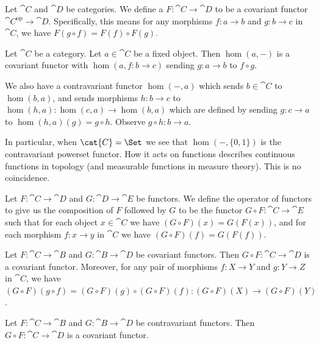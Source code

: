 \begin{definition}
Let $\cat{C}$ and $\cat{D}$ be categories.
We define a  $F\colon\cat{C}\to\cat{D}$
to be a covariant functor
$\cat{C}^{\text{op}}\to\cat{D}$. Specifically, this means for any
morphisms $f\colon a\to b$ and $g\colon b\to c$ in $\cat{C}$, we have
$F(g\circ f)=F(f)\circ F(g)$.
\end{definition}

\begin{example}
Let $\cat{C}$ be a category. Let $a\in\cat{C}$ be a fixed object.
Then $\hom(a,-)$ is a covariant functor with $\hom(a,f\colon b\to c)$
sending $g\colon a\to b$ to $f\circ g$.

We also have a contravariant functor $\hom(-,a)$ which sends
$b\in\cat{C}$ to $\hom(b,a)$, and sends morphisms $h\colon b\to c$ to
$\hom(h,a)\colon\hom(c,a)\to\hom(b,a)$ which are defined by sending
$g\colon c\to a$ to $\hom(h,a)(g)=g\circ h$. Observe $g\circ h\colon b\to a$.

In particular, when $\cat{C}=\Set$ we see that $\hom(-,\{0,1\})$ is
the contravariant powerset functor. How it acts on functions describes
continuous functions in topology (and measurable functions in measure
theory). This is no coincidence.
\end{example}

\begin{definition}
Let $F\colon\cat{C}\to\cat{D}$ and $G\colon\cat{D}\to\cat{E}$ be functors.
We define the  operator of functors to give us the
composition of $F$ followed by $G$ to be the functor $G\circ F\colon\cat{C}\to\cat{E}$
such that for each object $x\in\cat{C}$ we have $(G\circ F)(x)=G(F(x))$,
and for each morphism $f\colon x\to y$ in $\cat{C}$ we have
$(G\circ F)(f)=G(F(f))$.
\end{definition}

\begin{theorem}
Let $F\colon\cat{C}\to\cat{B}$ and $G\colon\cat{B}\to\cat{D}$ be
covariant functors. Then $G\circ F\colon\cat{C}\to\cat{D}$ is a
covariant functor. Moreover, for any pair of morphisms $f\colon X\to Y$ and $g\colon Y\to Z$
in $\cat{C}$, we have $(G\circ F)(g\circ f)=(G\circ F)(g)\circ(G\circ F)(f)\colon(G\circ F)(X)\to(G\circ F)(Y)$.
\end{theorem}

\begin{theorem}
Let $F\colon\cat{C}\to\cat{B}$ and $G\colon\cat{B}\to\cat{D}$ be
contravariant functors. Then $G\circ F\colon\cat{C}\to\cat{D}$ is a
covariant functor.
\end{theorem}

